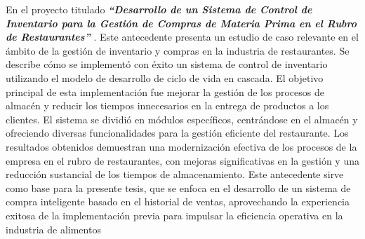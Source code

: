 \vspace{1\baselineskip}
En el proyecto titulado \textbf{\textit{“Desarrollo de un Sistema de Control de
    Inventario para la Gestión de Compras de Materia Prima en el Rubro de
    Restaurantes”}} \cite{condorena2017desarrollo}. Este antecedente presenta un estudio de caso relevante en el ámbito de la
gestión de inventario y compras en la industria de restaurantes. Se describe
cómo se implementó con éxito un sistema de control de inventario utilizando el
modelo de desarrollo de ciclo de vida en cascada. El objetivo principal de esta
implementación fue mejorar la gestión de los procesos de almacén y reducir los
tiempos innecesarios en la entrega de productos a los clientes. El sistema se
dividió en módulos específicos, centrándose en el almacén y ofreciendo diversas
funcionalidades para la gestión eficiente del restaurante. Los resultados
obtenidos demuestran una modernización efectiva de los procesos de la empresa
en el rubro de restaurantes, con mejoras significativas en la gestión y una
reducción sustancial de los tiempos de almacenamiento. Este antecedente sirve
como base para la presente tesis, que se enfoca en el desarrollo de un sistema
de compra inteligente basado en el historial de ventas, aprovechando la
experiencia exitosa de la implementación previa para impulsar la eficiencia
operativa en la industria de alimentos




